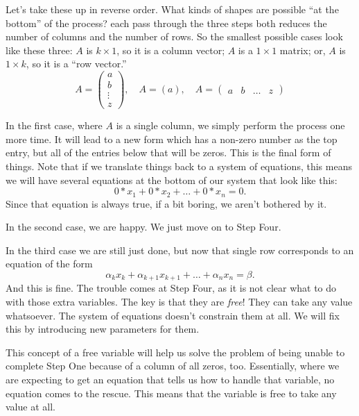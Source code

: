 \documentclass[elementsmain.tex]{subfiles}
\begin{document}
Let's take these up in reverse order. What kinds of shapes are possible ``at the bottom'' of the process? each pass through the three steps both reduces the number of columns and the number of rows. So the smallest possible cases look like these three: $A$ is $k\times 1$, so it is a column vector; $A$ is a $1\times 1$ matrix; or,  $A$ is $1\times k$, so it is a ``row vector.''
\begin{equation*}
A = \begin{pmatrix} a \\ b \\ \vdots \\ z \end{pmatrix}, \quad A = (a), \quad
A = \begin{pmatrix} a & b & \dots & z \end{pmatrix}
\end{equation*}

In the first case, where $A$ is a single column, we simply perform the process one more time. It will lead to a new form which has a non-zero number as the top entry, but all of the entries below that will be zeros. This is the final form of things.
Note that if we translate things back to a system of equations, this means we will have several equations at the bottom of our system that look like this:
\begin{equation*}
0*x_1 + 0*x_2 + \dots + 0*x_n = 0.
\end{equation*}
Since that equation is always true, if a bit boring, we aren't bothered by it.


In the second case, we are happy. We just move on to Step Four.

In the third case we are still just done, but now that single row corresponds to an equation of the form
\begin{equation*}
\alpha_k x_k + \alpha_{k+1} x_{k+1} + \dots + \alpha_n x_n = \beta.
\end{equation*}
And this is fine. The trouble comes at Step Four, as it is not clear what to do with those extra variables. The key is that they are \emph{free}! They can take any value  whatsoever. The system of equations doesn't constrain them at all. We will fix this by introducing new parameters for them.

This concept of a free variable will help us solve the problem of being unable to complete Step One because of a column of all zeros, too. Essentially, where we are expecting to get an equation that tells us how to handle that variable, no equation comes to the rescue. This means that the variable is free to take any value at all.
\end{document}
